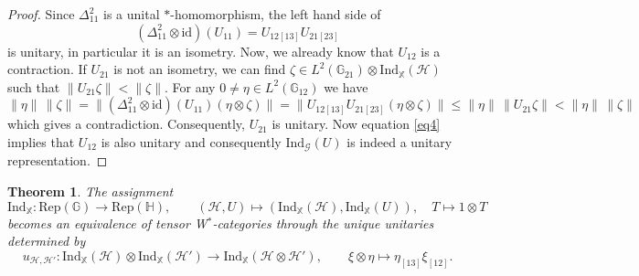 \documentclass[reqno]{amsart}
\numberwithin{equation}{section}
\newtheorem{Theorem}{Theorem}[section]
\newcommand{\id}{\mathrm{id}}
\newcommand{\Hsp}{\mathcal{H}}
\newcommand{\G}{\mathbb{G}}
\newcommand{\Hh}{\mathbb{H}}
\newcommand{\X}{\mathbb{X}}
\newcommand{\msG}{\mathscr{G}}
\newcommand{\Rep}{\mathrm{Rep}}
\newcommand{\Ind}{\mathrm{Ind}}
\newcommand{\mc}{\mathcal}
\newcommand{\GG}{\mathbb{G}}
\begin{document}
\begin{proof}
Since $\Delta_{11}^2$ is a unital $*$-homomorphism, the left hand side of
\begin{equation}\label{eq4}
(\Delta_{11}^2\otimes\id)(U_{11})=U_{12 [13]} U_{21 [23]}
\end{equation}
is unitary, in particular it is an isometry. Now, we already know that $U_{12}$ is a contraction. If $U_{21}$ is not an isometry, we can find $\zeta\in L^2(\GG_{21})\otimes \Ind_{\X}(\mc{H})$ such that $\|U_{21} \zeta\|<\|\zeta\|$. For any $0\neq \eta\in L^2(\GG_{12})$ we have
\[
\|\eta\|\, \|\zeta\|=\| (\Delta_{11}^2\otimes\id)(U_{11}) (\eta\otimes\zeta)\| = 
\|U_{12 [13]} U_{21 [23]}(\eta\otimes\zeta)\| \le 
\|\eta\|\,\|U_{21} \zeta\|<\|\eta\| \,\|\zeta\|
\]
which gives a contradiction. Consequently, $U_{21}$ is unitary. Now equation \eqref{eq4} implies that $U_{12}$ is also unitary and consequently $\Ind_{\msG}(U)$ is indeed a unitary representation.
\end{proof}

\begin{Theorem}\label{TheoIndRep}
The assignment 
\begin{equation}\label{EqMonoidEquiv}
\Ind_{\X}\colon \Rep(\G) \rightarrow \Rep(\Hh),\qquad (\Hsp,U) \mapsto (\Ind_{\X}(\Hsp),\Ind_{\X}(U)),\quad 
T\mapsto 1\otimes T
\end{equation}
becomes an equivalence of tensor W$^*$-categories through the unique unitaries determined by 
\begin{equation}\label{EqInterTwinerMonoid}
u_{\Hsp,\Hsp'}\colon \Ind_{\X}(\Hsp)\otimes \Ind_{\X}(\Hsp') \rightarrow \Ind_{\X}(\Hsp\otimes \Hsp'),\qquad \xi\otimes \eta \mapsto \eta_{[13]}\xi_{[12]}.
\end{equation}
\end{Theorem}
\end{document}
